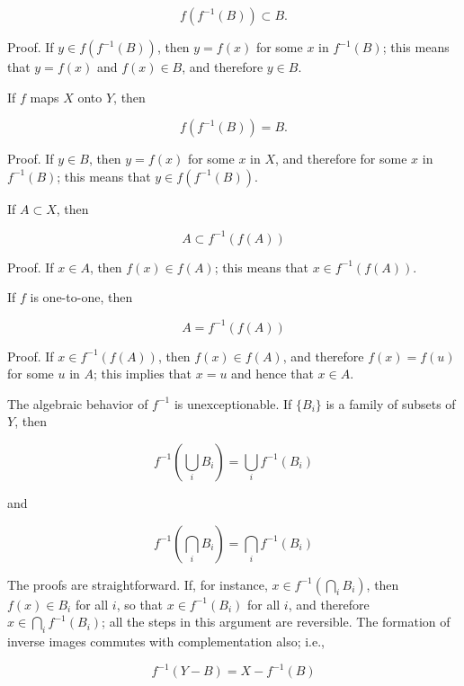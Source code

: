 \begin{equation*} 
f(f^{-1}(B)) \subset B.
\end{equation*}

Proof. If $y \in f(f^{-1}(B))$, then $y = f(x)$ for some $x$ in $f^{-1}(B)$; this means that $y = f(x)$ and $f(x) \in B$, and therefore $y \in B$. 

If $f$ maps $X$ onto $Y$, then 

\begin{equation*} 
f(f^{-1}(B)) = B.
\end{equation*}

Proof. If $y \in B$, then $y = f(x)$ for some $x$ in $X$, and therefore for some $x$ in $f^{-1}(B)$; this means that $y \in f(f^{-1}(B))$. 

If $A \subset X$, then 

\begin{equation*}
A \subset f^{-1}(f(A))
\end{equation*}

Proof. If $x \in A$, then $f(x) \in f(A)$; this means that $x \in f^{-1}(f(A))$.

If $f$ is one-to-one, then 

\begin{equation*}
A = f^{-1}(f(A))
\end{equation*}

Proof. If $x \in f^{-1}(f(A))$, then $f(x) \in f(A)$, and therefore $f(x) = f(u)$ for some $u$ in $A$; this implies that $x = u$ and hence that $x \in A$. 


The algebraic behavior of $f^{-1}$ is unexceptionable. If $ \{ B_{i} \} $ is a family of subsets of $Y$, then 

\begin{equation*}
f^{-1}( \bigcup_{i} B_{i} ) = \bigcup_{i}f^{-1}(B_{i})
\end{equation*}

and

\begin{equation*}
f^{-1}( \bigcap_{i} B_{i} ) = \bigcap_{i}f^{-1}(B_{i})
\end{equation*}

The proofs are straightforward. If, for instance, $x \in f^{-1}( \bigcap_{i} B_{i})$, then $f(x) \in B_{i}$ for all $i$, so that $x \in f^{-1}(B_{i})$ for all $i$, and therefore $x \in \bigcap_{i}f^{-1}(B_{i})$; all the steps in this argument are reversible. The formation of inverse images commutes with complementation also; i.e., 

\begin{equation*}
f^{-1}(Y - B) = X - f^{-1}(B)
\end{equation*}

